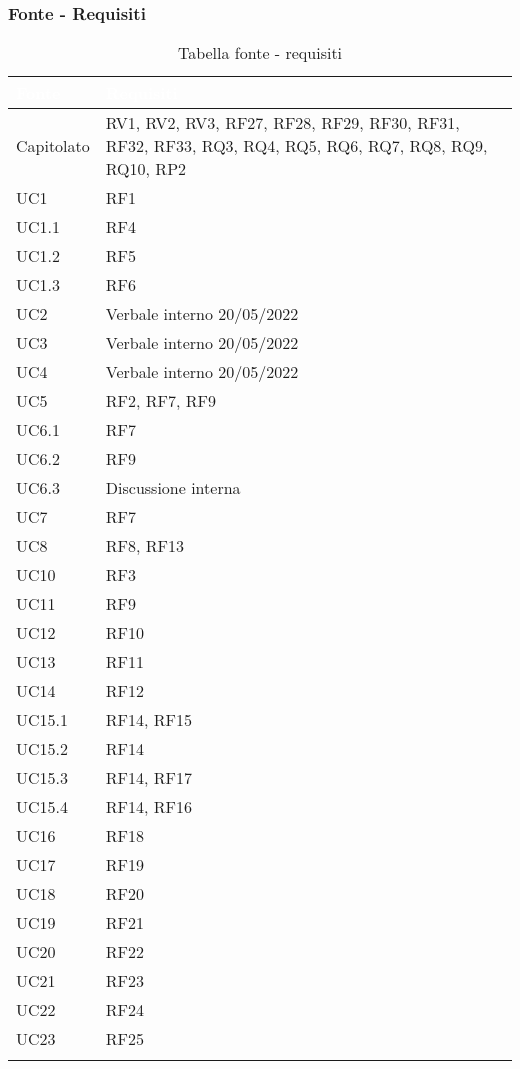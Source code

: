 \subsubsection{Fonte - Requisiti}
{
      \setlength{\freewidth}{\dimexpr\textwidth-0\tabcolsep}
      \renewcommand{\arraystretch}{1.5}
      \centering
      \setlength{\aboverulesep}{0pt}
      \setlength{\belowrulesep}{0pt}
      \begin{longtable}{C{.47\freewidth} C{.47\freewidth}}
         \toprule
      \textcolor{white}{\textbf{Fonte}}&
      \textcolor{white}{\textbf{Requisiti}}\\
      \toprule
      \endhead
      
      Capitolato & RV1, RV2, RV3, RF27, RF28, RF29, RF30, RF31, RF32, RF33,
                   RQ3, RQ4, RQ5, RQ6, RQ7, RQ8, RQ9, RQ10,
                   RP2\\
      UC1 & RF1\\
      UC1.1 & RF4\\
      UC1.2 & RF5\\
      UC1.3 & RF6\\
      UC2 & Verbale interno 20/05/2022\\
      UC3 & Verbale interno 20/05/2022\\
      UC4 & Verbale interno 20/05/2022\\
      UC5 & RF2, RF7, RF9\\
      UC6.1 & RF7\\
      UC6.2 & RF9\\
      UC6.3 & Discussione interna\\
      UC7 & RF7 \\
      UC8 & RF8, RF13 \\
      UC10 & RF3 \\
      UC11 & RF9\\
      UC12 & RF10\\
      UC13 & RF11\\
      UC14 & RF12\\
      UC15.1 & RF14, RF15\\
      UC15.2 & RF14\\
      UC15.3 & RF14, RF17\\
      UC15.4 & RF14, RF16\\
      UC16 & RF18\\
      UC17 & RF19\\
      UC18 & RF20\\
      UC19 & RF21\\
      UC20 & RF22\\
      UC21 & RF23\\
      UC22 & RF24\\
      UC23 & RF25\\		
      \bottomrule
      \caption{Tabella fonte - requisiti}
      \end{longtable}
}
\newpage
